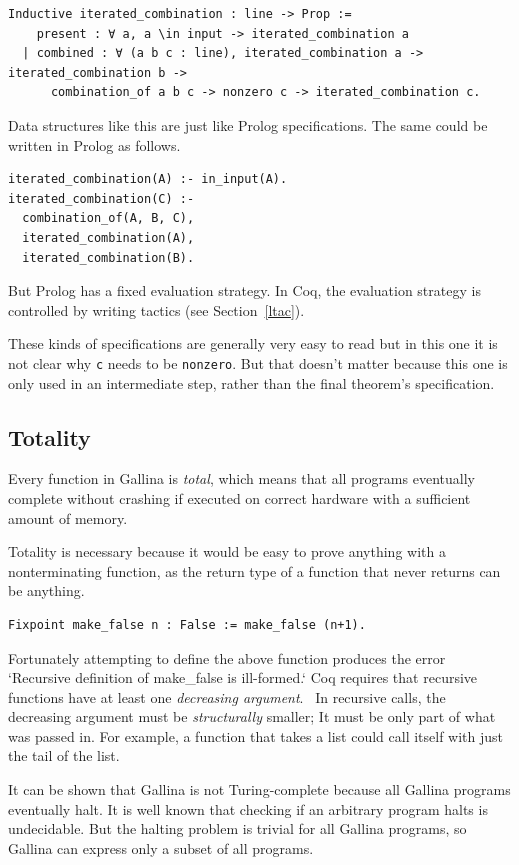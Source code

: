 \documentclass[english, 12pt, a4paper, sci, a-1b, online]{aaltothesis}
\newcommand\icoq[1]{\texttt{#1}}
\begin{document}
\begin{verbatim}
Inductive iterated_combination : line -> Prop :=
    present : ∀ a, a \in input -> iterated_combination a
  | combined : ∀ (a b c : line), iterated_combination a -> iterated_combination b ->
      combination_of a b c -> nonzero c -> iterated_combination c.
\end{verbatim}

Data structures like this are just like Prolog specifications. The same could be written in Prolog as follows.
\begin{verbatim}
iterated_combination(A) :- in_input(A).
iterated_combination(C) :-
  combination_of(A, B, C),
  iterated_combination(A),
  iterated_combination(B).
\end{verbatim}
But Prolog has a fixed evaluation strategy. In Coq, the evaluation strategy is controlled by writing tactics (see Section~\ref{ltac}).

These kinds of specifications are generally very easy to read but in this one it is not clear why \icoq{c} needs to be \icoq{nonzero}. But that doesn't matter because this one is only used in an intermediate step, rather than the final theorem's specification.

\subsection{Totality}\label{totality}

Every function in Gallina is \emph{total}, which means that all programs eventually complete without crashing if executed on correct hardware with a sufficient amount of memory.

Totality is necessary because it would be easy to prove anything with a nonterminating function, as the return type of a function that never returns can be anything.
\begin{verbatim}
Fixpoint make_false n : False := make_false (n+1).
\end{verbatim}
Fortunately attempting to define the above function produces the error `Recursive definition of make\_false is ill-formed.` Coq requires that recursive functions have at least one \emph{decreasing argument}.~\cite{coqRefman} In recursive calls, the decreasing argument must be \emph{structurally} smaller; It must be only part of what was passed in. For example, a function that takes a list could call itself with just the tail of the list.

It can be shown that Gallina is not Turing-complete because all Gallina programs eventually halt. It is well known that checking if an arbitrary program halts is undecidable. But the halting problem is trivial for all Gallina programs, so Gallina can express only a subset of all programs.
\end{document}
